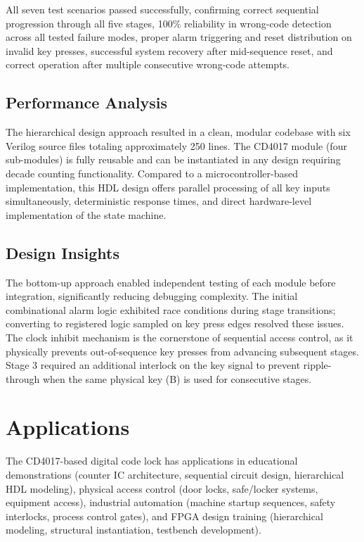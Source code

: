 \documentclass[12pt,a4paper]{report}
\begin{document}
All seven test scenarios passed successfully, confirming correct sequential progression through all five stages, 100\% reliability in wrong-code detection across all tested failure modes, proper alarm triggering and reset distribution on invalid key presses, successful system recovery after mid-sequence reset, and correct operation after multiple consecutive wrong-code attempts.

\section{Performance Analysis}

The hierarchical design approach resulted in a clean, modular codebase with six Verilog source files totaling approximately 250 lines. The CD4017 module (four sub-modules) is fully reusable and can be instantiated in any design requiring decade counting functionality. Compared to a microcontroller-based implementation, this HDL design offers parallel processing of all key inputs simultaneously, deterministic response times, and direct hardware-level implementation of the state machine.

\section{Design Insights}

The bottom-up approach enabled independent testing of each module before integration, significantly reducing debugging complexity. The initial combinational alarm logic exhibited race conditions during stage transitions; converting to registered logic sampled on key press edges resolved these issues. The clock inhibit mechanism is the cornerstone of sequential access control, as it physically prevents out-of-sequence key presses from advancing subsequent stages. Stage 3 required an additional interlock on the key signal to prevent ripple-through when the same physical key (B) is used for consecutive stages.

\chapter{Applications}

The CD4017-based digital code lock has applications in educational demonstrations (counter IC architecture, sequential circuit design, hierarchical HDL modeling), physical access control (door locks, safe/locker systems, equipment access), industrial automation (machine startup sequences, safety interlocks, process control gates), and FPGA design training (hierarchical modeling, structural instantiation, testbench development).
\end{document}
